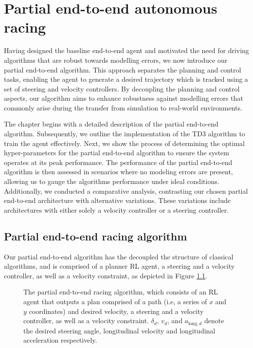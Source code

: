 \chapter{Partial end-to-end autonomous racing}
\label{chp:partial_end_to_end_autonomous_racing}

Having designed the baseline end-to-end agent and motivated the need for driving algorithms that are robust towards modelling errors, we now introduce our partial end-to-end algorithm.
This approach separates the planning and control tasks, enabling the agent to generate a desired trajectory which is tracked using a set of steering and velocity controllers.
By decoupling the planning and control aspects, our algorithm aims to enhance robustness against modelling errors that commonly arise during the transfer from simulation to real-world environments.

The chapter begins with a detailed description of the partial end-to-end algorithm.
Subsequently, we outline the implementation of the TD3 algorithm to train the agent effectively.
Next, we show the process of determining the optimal hyper-parameters for the partial end-to-end algorithm to ensure the system operates at its peak performance. 
The performance of the partial end-to-end algorithm is then assessed in scenarios where no modeling errors are present, allowing us to gauge the algorithms performance under ideal conditions. 
Additionally, we conducted a comparative analysis, contrasting our chosen partial end-to-end architecture with alternative variations. 
These variations include architectures with either solely a velocity controller or a steering controller. 



\section{Partial end-to-end racing algorithm}

Our partial end-to-end algorithm has the decoupled the structure of classical algorithms, and is comprised of a planner RL agent, 
a steering and a velocity controller, as well as a velocity constraint, as depicted in Figure \ref{fig:steer_vel_architecture}.

\begin{figure}[htb!]
    \centering
    
    \caption[The partial end-to-end racing algorithm]{The partial end-to-end racing algorithm, which consists of an RL agent that outputs a plan comprised of a path (i.e, a series of $x$ and $y$ coordinates) and desired velocity, a steering and a velocity controller, as well as a velocity constraint. $\delta_{d}$, $v_{d}$, and $a_{\text{long},d}$ denote the desired steering angle, longitudinal velocity and longitudinal acceleration respectively.}
    \label{fig:steer_vel_architecture}
\end{figure}


